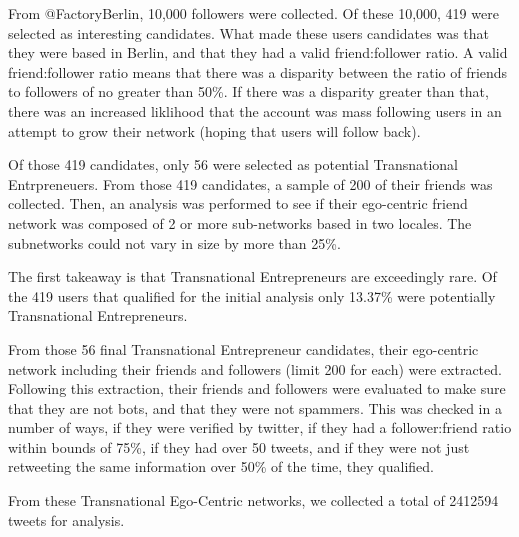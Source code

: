 From @FactoryBerlin, 10,000 followers were collected. Of these 10,000,
419 were selected as interesting candidates. What made these users
candidates was that they were based in Berlin, and that they had
a valid friend:follower ratio. A valid friend:follower ratio means
that there was a disparity between the ratio of friends to followers
of no greater than 50\%. If there was a disparity greater than that,
there was an increased liklihood that the account was mass following
users in an attempt to grow their network (hoping that users will follow
back).

Of those 419 candidates, only 56 were selected as potential Transnational
Entrpreneuers. From those 419 candidates, a sample of 200 of their friends
was collected. Then, an analysis was performed to see if their ego-centric
friend network was composed of 2 or more sub-networks based in two locales.
The subnetworks could not vary in size by more than 25\%.

The first takeaway is that Transnational Entrepreneurs are exceedingly
rare. Of the 419 users that qualified for the initial analysis only
13.37\% were potentially Transnational Entrepreneurs.

From those 56 final Transnational Entrepreneur candidates, their
ego-centric network including their friends and followers (limit 200
for each) were extracted. Following this extraction, their friends and
followers were evaluated to make sure that they are not bots, and that
they were not spammers. This was checked in a number of ways, if they
were verified by twitter, if they had a follower:friend ratio within
bounds of 75\%, if they had over 50 tweets, and if they were not just
retweeting the same information over 50\% of the time, they qualified.

From these Transnational Ego-Centric networks, we collected a total of
2412594 tweets for analysis.
